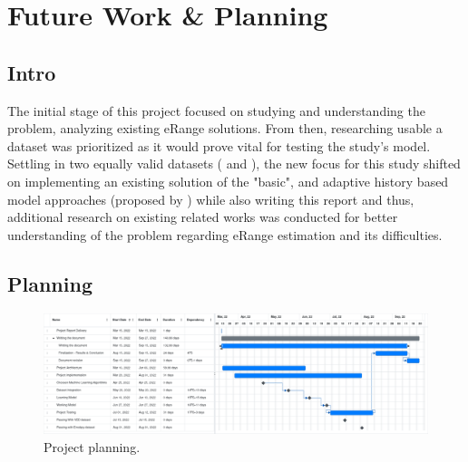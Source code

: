 \chapter{Future Work \& Planning}
\label{cha:planning}
\section{Intro}
\label{sec:planningIntro}
The initial stage of this project focused on 
studying and understanding the problem,
analyzing existing \gls{eRange} solutions.
From then, researching usable a \gls{dataset}
was prioritized as it would prove vital
for testing the study's model.
Settling in two equally valid \glspl{dataset}
(\cite{vedDataset} and \cite{emobpy}),
the new focus for this study shifted on
implementing an existing solution of 
the "basic", and adaptive history based model
approaches (proposed by \cite{classicEVX})
while also writing this report and thus,
additional research on existing related works 
was conducted for better understanding
of the problem regarding \gls{eRange} estimation
and its difficulties.

\section{Planning}
\label{sec:planningPlanning}

\begin{figure}[H]
    \begin{center}
        \includegraphics[scale=0.27]{../figures/planning2}
        \caption{Project planning.}
    \end{center}
\end{figure}

